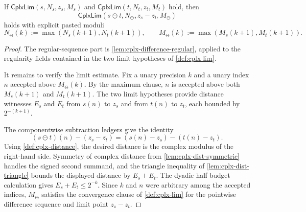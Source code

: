 \begin{theorem}
\label{thm:cplx-lim-difference}
If $\mathsf{CplxLim}(s,N_s,z_s,M_s)$ and $\mathsf{CplxLim}(t,N_t,z_t,M_t)$ hold, then
$$
\mathsf{CplxLim}(s\ominus t,N_{\ominus},z_s-z_t,M_{\ominus})
$$
holds with explicit pasted moduli
$$
N_{\ominus}(k):=\max(N_s(k+1),N_t(k+1)),
\qquad
M_{\ominus}(k):=\max(M_s(k+1),M_t(k+1)).
$$
\end{theorem}
\begin{proof}
The regular-sequence part is \autoref{lem:cplx-difference-regular}, applied to the regularity fields contained in the two limit hypotheses of \autoref{def:cplx-lim}.

It remains to verify the limit estimate. Fix a unary precision $k$ and a unary index $n$ accepted above $M_{\ominus}(k)$. By the maximum clause, $n$ is accepted above both $M_s(k+1)$ and $M_t(k+1)$. The two limit hypotheses provide distance witnesses $E_s$ and $E_t$ from $s(n)$ to $z_s$ and from $t(n)$ to $z_t$, each bounded by $2^{-(k+1)}$.

The componentwise subtraction ledgers give the identity
$$
(s\ominus t)(n)-(z_s-z_t)=(s(n)-z_s)-(t(n)-z_t).
$$
Using \autoref{def:cplx-distance}, the desired distance is the complex modulus of the right-hand side. Symmetry of complex distance from \autoref{lem:cplx-dist-symmetric} handles the signed second summand, and the triangle inequality of \autoref{lem:cplx-dist-triangle} bounds the displayed distance by $E_s+E_t$. The dyadic half-budget calculation gives $E_s+E_t\leq 2^{-k}$. Since $k$ and $n$ were arbitrary among the accepted indices, $M_{\ominus}$ satisfies the convergence clause of \autoref{def:cplx-lim} for the pointwise difference sequence and limit point $z_s-z_t$.
\end{proof}

